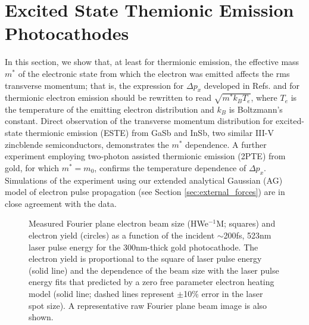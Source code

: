 
\section{Excited State Themionic Emission Photocathodes}

In this section, we show that, at least for thermionic emission, the effective mass $m^*$ of the electronic state from which the electron was emitted affects the rms transverse momentum; that is, the expression for $\Delta p_x$ developed in Refs. \cite{dowell_quantum_2009} and \cite{jensen_emittance_2010} for thermionic electron emission should be rewritten to read $\sqrt{m^* k_B T_e}$, where $T_e$ is the temperature of the emitting electron distribution and $k_B$ is Boltzmann's constant.
Direct observation of the transverse momentum distribution for excited-state thermionic emission (ESTE) from GaSb and InSb, two similar III-V zincblende semiconductors, demonstrates the $m^*$ dependence.  A further experiment employing two-photon assisted thermionic emission (2PTE) from gold, for which $m^* = m_0$\cite{johnson_optical_1972}, confirms the temperature dependence of $\Delta p_x$.  Simulations of the experiment using our extended analytical Gaussian (AG) model of electron pulse propagation (see Section \ref{sec:external_forces}) are in close agreement with the data. 

\begin{figure}
  \centering
  
  \caption[Measured Fourier plane electron beam size and yield vs incident laser pulse energy on gold photocathode]{
    Measured Fourier plane electron beam size (HWe$^{-1}$M; squares) and electron yield (circles) as a function of the incident $\sim$200fs, 523nm laser pulse energy for the 300nm-thick gold photocathode.
    The electron yield is proportional to the square of laser pulse energy (solid line) and the dependence of the beam size with the laser pulse energy fits that predicted by a zero free parameter electron heating model (solid line; dashed lines represent $\pm$10\% error in the laser spot size).
    A representative raw Fourier plane beam image is also shown.
  }
  \label{fig:gold-emission}
\end{figure}

